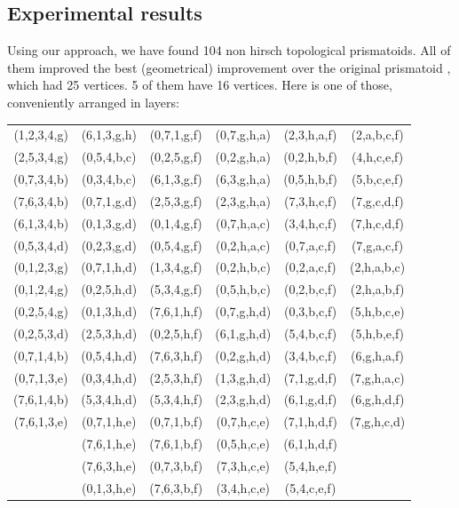 \documentclass[12pt,a4paper]{article}
\theoremstyle{plain}
\theoremstyle{definition}
\begin{document}
\subsection{Experimental results}
Using our approach, we have found 104 non hirsch topological prismatoids. All of them improved the best (geometrical) improvement over the original prismatoid \cite{improvement}, which had 25 vertices. 5 of them have 16 vertices. Here is one of those, conveniently arranged in layers:

\begin{tabular} {c|cc|cc|c}
(1,2,3,4,g) & (6,1,3,g,h) & (0,7,1,g,f) & (0,7,g,h,a) & (2,3,h,a,f) & (2,a,b,c,f) \\
(2,5,3,4,g) & (0,5,4,b,c) & (0,2,5,g,f) & (0,2,g,h,a) & (0,2,h,b,f) & (4,h,c,e,f) \\
(0,7,3,4,b) & (0,3,4,b,c) & (6,1,3,g,f) & (6,3,g,h,a) & (0,5,h,b,f) & (5,b,c,e,f) \\
(7,6,3,4,b) & (0,7,1,g,d) & (2,5,3,g,f) & (2,3,g,h,a) & (7,3,h,c,f) & (7,g,c,d,f) \\
(6,1,3,4,b) & (0,1,3,g,d) & (0,1,4,g,f) & (0,7,h,a,c) & (3,4,h,c,f) & (7,h,c,d,f) \\
(0,5,3,4,d) & (0,2,3,g,d) & (0,5,4,g,f) & (0,2,h,a,c) & (0,7,a,c,f) & (7,g,a,c,f) \\
(0,1,2,3,g) & (0,7,1,h,d) & (1,3,4,g,f) & (0,2,h,b,c) & (0,2,a,c,f) & (2,h,a,b,c) \\
(0,1,2,4,g) & (0,2,5,h,d) & (5,3,4,g,f) & (0,5,h,b,c) & (0,2,b,c,f) & (2,h,a,b,f) \\
(0,2,5,4,g) & (0,1,3,h,d) & (7,6,1,h,f) & (0,7,g,h,d) & (0,3,b,c,f) & (5,h,b,c,e) \\
(0,2,5,3,d) & (2,5,3,h,d) & (0,2,5,h,f) & (6,1,g,h,d) & (5,4,b,c,f) & (5,h,b,e,f) \\
(0,7,1,4,b) & (0,5,4,h,d) & (7,6,3,h,f) & (0,2,g,h,d) & (3,4,b,c,f) & (6,g,h,a,f) \\
(0,7,1,3,e) & (0,3,4,h,d) & (2,5,3,h,f) & (1,3,g,h,d) & (7,1,g,d,f) & (7,g,h,a,c) \\
(7,6,1,4,b) & (5,3,4,h,d) & (5,3,4,h,f) & (2,3,g,h,d) & (6,1,g,d,f) & (6,g,h,d,f) \\
(7,6,1,3,e) & (0,7,1,h,e) & (0,7,1,b,f) & (0,7,h,c,e) & (7,1,h,d,f) & (7,g,h,c,d) \\
            & (7,6,1,h,e) & (7,6,1,b,f) & (0,5,h,c,e) & (6,1,h,d,f) &             \\
            & (7,6,3,h,e) & (0,7,3,b,f) & (7,3,h,c,e) & (5,4,h,e,f) &             \\
            & (0,1,3,h,e) & (7,6,3,b,f) & (3,4,h,c,e) & (5,4,c,e,f) &             \\

\end{tabular}
\end{document}
